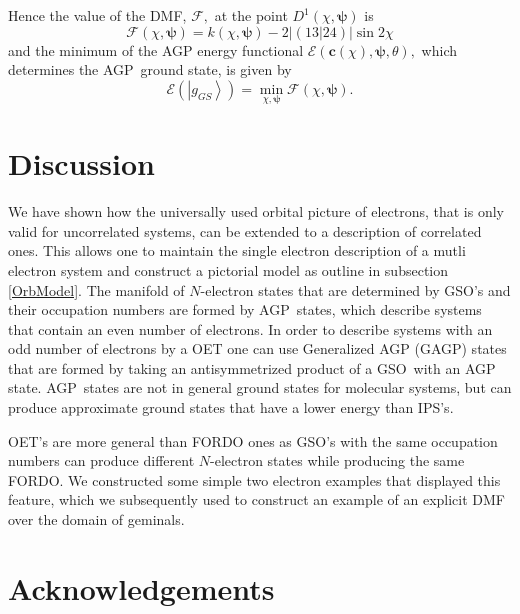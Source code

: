\documentclass[aps,preprint]{revtex4}%
\begin{document}
Hence the value of the DMF, $\mathcal{F},$ at the point $D^{1}\left(
\chi,\boldsymbol{\psi}\right)  $ is%
\begin{equation}
\mathcal{F}\left(  \chi,\boldsymbol{\psi}\right)  =k\left(  \chi
,\boldsymbol{\psi}\right)  -2\left\vert \left(  \left.  13\right\vert
24\right)  \right\vert \sin2\chi
\end{equation}
and the minimum of the AGP energy functional $\mathcal{E}\left(
\boldsymbol{c}\left(  \chi\right)  ,\boldsymbol{\psi},\theta\right)  ,$ which
determines the AGP\ ground state, is given by
\begin{equation}
\mathcal{E}\left(  \left\vert g_{GS}\right\rangle \right)  =\min
_{\chi,\boldsymbol{\psi}}\mathcal{F}\left(  \chi,\boldsymbol{\psi}\right)  .
\end{equation}


\section{Discussion}

We have shown how the universally used orbital picture of electrons, that is
only valid for uncorrelated systems, can be extended to a description of
correlated ones. This allows one to maintain the single electron description
of a mutli electron system and construct a pictorial model as outline in
subsection \ref{OrbModel}. The manifold of $N$-electron states that are
determined by GSO's and their occupation numbers are formed by AGP\ states,
which describe systems that contain an even number of electrons. In order to
describe systems with an odd number of electrons by a OET one can use
Generalized AGP (GAGP) states \cite{1966A03263} that are formed by taking an
antisymmetrized product of a GSO\ with an AGP state. AGP\ states are not in
general ground states for molecular systems, but can produce approximate
ground states that have a lower energy than IPS's.

OET's are more general than FORDO ones as GSO's with the same occupation
numbers can produce different $N$-electron states while producing the same
FORDO. We constructed some simple two electron examples that displayed this
feature, which we subsequently used to construct an example of an explicit DMF
over the domain of geminals.

\section{Acknowledgements}
\end{document}

